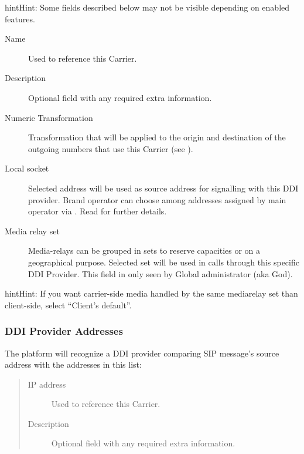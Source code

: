 \documentclass[letterpaper,10pt,english]{sphinxmanual}
\begin{document}
\begin{notice}{hint}{Hint:}
Some fields described below may not be visible depending on enabled features.
\begin{description}
\item[{Name}] \leavevmode
Used to reference this Carrier.

\item[{Description}] \leavevmode
Optional field with any required extra information.

\item[{Numeric Transformation}] \leavevmode
Transformation that will be applied to the origin and destination of the
outgoing numbers that use this Carrier
(see {\hyperref[administration_portal/brand/settings/numeric_transformations:numeric\string-transformations]{}}).

\item[{Local socket}] \leavevmode
Selected address will be used as source address for signalling with this DDI provider. Brand operator can choose among
addresses assigned by main operator via {\hyperref[administration_portal/platform/brands:brands]{}}. Read {\hyperref[administration_portal/platform/infrastructure/proxy_trunks:proxy\string-trunks]{}} for further details.

\item[{Media relay set}] \leavevmode
Media-relays can be grouped in sets to reserve capacities or on a geographical purpose. Selected set will be used
in calls through this specific DDI Provider. This field in only seen by Global administrator (aka God).

\end{description}
\end{notice}

\begin{notice}{hint}{Hint:}
If you want carrier-side media handled by the same mediarelay set than client-side, select ``Client's default''.
\end{notice}


\subsubsection{DDI Provider Addresses}
\label{administration_portal/brand/providers/ddi_providers:ddi-provider-addresses}
The platform will recognize a DDI provider comparing SIP message's source address with the addresses in this list:
\begin{quote}
\begin{description}
\item[{IP address}] \leavevmode
Used to reference this Carrier.

\item[{Description}] \leavevmode
Optional field with any required extra information.

\end{description}
\end{quote}
\end{document}

